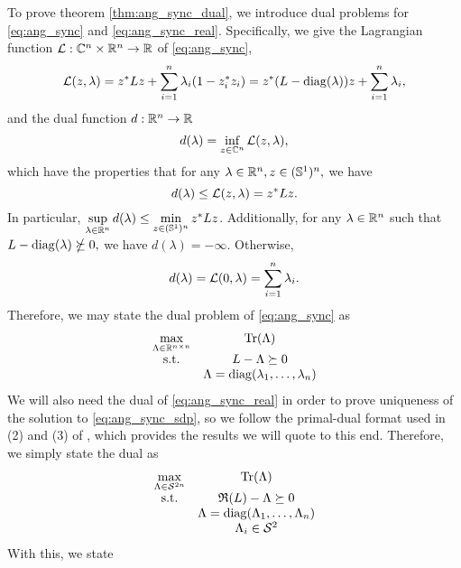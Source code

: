 To prove theorem \ref{thm:ang_sync_dual}, we introduce dual problems for \eqref{eq:ang_sync} and \eqref{eq:ang_sync_real}.  Specifically, we give the Lagrangian function $\mathcal{L} : \mathbb{C}^n \times \mathbb{R}^n \to \mathbb{R}$ of \eqref{eq:ang_sync}, \[\mathcal{L}(z, \lambda) = z^* L z + \sum_{i = 1}^n \lambda_i (1 - z_i^* z_i) = z^*(L - \operatorname{diag}(\lambda)) z + \sum_{i = 1}^n \lambda_i,\] and the dual function $d : \mathbb{R}^n \to \mathbb{R}$ \[d(\lambda) = \inf_{z \in \mathbb{C}^n} \mathcal{L}(z, \lambda),\] which have the properties that for any $\lambda \in \mathbb{R}^n, z \in (\mathbb{S}^1)^n,$ we have \[d(\lambda) \le \mathcal{L}(z, \lambda) = z^* L z.\]  In particular, $\sup\limits_{\lambda \in \mathbb{R}^n} d(\lambda) \le \min\limits_{z \in (\mathbb{S}^1)^n} z^* L z$.  Additionally, for any $\lambda \in \mathbb{R}^n$ such that $L - \operatorname{diag}(\lambda) \nsucceq 0,$ we have $d(\lambda) = - \infty$.  Otherwise, \[d(\lambda) = \mathcal{L}(0, \lambda) = \sum_{i = 1}^n \lambda_i.\]  Therefore, we may state the dual problem of \eqref{eq:ang_sync} as \begin{equation} \begin{array}{cc} \max\limits_{\Lambda \in \mathbb{R}^{n \times n}} & \operatorname{Tr}(\Lambda) \\ \text{s.t.} & L - \Lambda \succeq 0 \\ & \Lambda = \operatorname{diag}(\lambda_1, \ldots, \lambda_n) \end{array} \label{eq:ang_sync_dual} \end{equation}  We will also need the dual of \eqref{eq:ang_sync_real} in order to prove uniqueness of the solution to \eqref{eq:ang_sync_sdp}, so we follow the primal-dual format used in (2) and (3) of \cite{alizadeh1997nondegeneracy}, which provides the results we will quote to this end.  Therefore, we simply state the dual as \begin{equation} \begin{array}{cc} \max\limits_{\Lambda \in \mathcal{S}^{2n}} & \operatorname{Tr}(\Lambda) \\ \text{s.t.} & \mathfrak{R}(L) - \Lambda \succeq 0 \\ & \Lambda = \operatorname{diag}(\Lambda_1, \ldots, \Lambda_n) \\ & \Lambda_i \in \mathcal{S}^2 \end{array} \label{eq:ang_sync_real_dual} \end{equation}  With this, we state 
